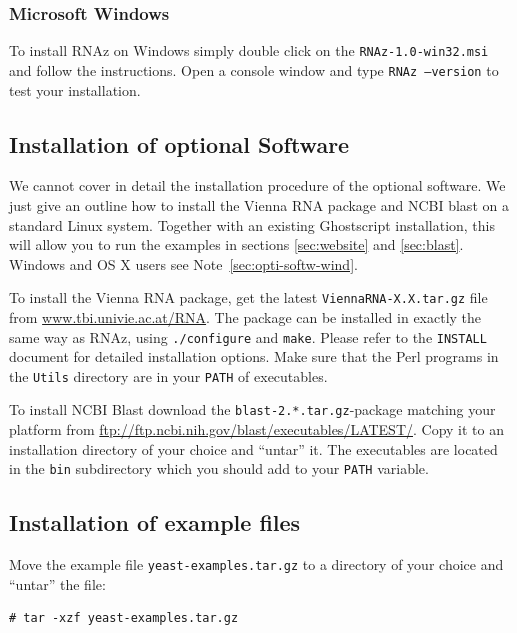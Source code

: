 \documentclass[11pt]{article}
\begin{document}
\subsubsection{Microsoft Windows}
\label{sec:microsoft-windows}

To install RNAz on Windows simply double click on the
\texttt{RNAz-1.0-win32.msi} and follow the instructions. Open a console
window and type \texttt{RNAz --version} to test your installation.

\subsection{Installation of optional Software}
\label{sec:inst-opti-softw}

We cannot cover in detail the installation procedure of the optional
software. We just give an outline how to install the Vienna RNA package and
NCBI blast on a standard Linux system. Together with an existing
Ghostscript installation, this will allow you to run the examples in
sections \ref{sec:website} and \ref{sec:blast}. Windows and OS X users see
Note~\ref{sec:opti-softw-wind}.

To install the Vienna RNA package, get the latest
\texttt{ViennaRNA-X.X.tar.gz} file from \url{www.tbi.univie.ac.at/RNA}. The
package can be installed in exactly the same way as RNAz, using
\texttt{./configure} and \texttt{make}. Please refer to the
\texttt{INSTALL} document for detailed installation options. Make sure that
the Perl programs in the \texttt{Utils} directory are in your \texttt{PATH}
of executables.

To install NCBI Blast download the \texttt{blast-2.*.tar.gz}-package
matching your platform from
\url{ftp://ftp.ncbi.nih.gov/blast/executables/LATEST/}. Copy it to an
installation directory of your choice and ``untar'' it. The executables are
located in the \texttt{bin} subdirectory which you should add to your
\texttt{PATH} variable.

\subsection{Installation of example files}

Move the example file \texttt{yeast-examples.tar.gz} to a directory of your
choice and ``untar'' the file:

\begin{verbatim}
# tar -xzf yeast-examples.tar.gz
\end{verbatim}
\end{document}

